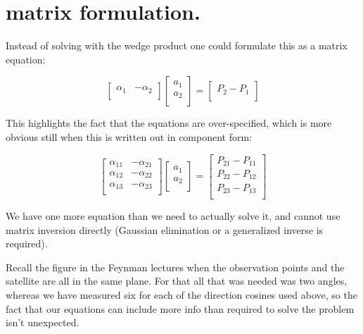 \section{matrix formulation. }

Instead of solving with the wedge product one could formulate this as a matrix equation:

\begin{equation}\label{eqn:locSat:twopointsmatrix}
\begin{bmatrix}
\alpha_1 & -\alpha_2 \\
\end{bmatrix}
\begin{bmatrix}
a_1 \\
a_2 \\
\end{bmatrix}
= 
\begin{bmatrix}
P_2 - P_1 \\
\end{bmatrix}
\end{equation}

This highlights the fact that the equations are over-specified, which is more obvious still when this is written out in component form:

\begin{equation}
\begin{bmatrix}
\alpha_{11} & -\alpha_{21} \\
\alpha_{12} & -\alpha_{22} \\
\alpha_{13} & -\alpha_{23} \\
\end{bmatrix}
\begin{bmatrix}
a_1 \\
a_2 \\
\end{bmatrix}
=
\begin{bmatrix}
P_{21} - P_{11} \\
P_{22} - P_{12} \\
P_{23} - P_{13} \\
\end{bmatrix}
\end{equation}

We have one more equation than we need to actually solve it, and cannot use matrix inversion directly (Gaussian elimination or a generalized inverse is required).

Recall the figure in the Feynman lectures when the observation points and the satellite are all in the same plane.  For that all that was needed was two angles, whereas we have measured six for each of the direction cosines used above, so the fact that our equations can include more info than required to solve the problem isn't unexpected.

